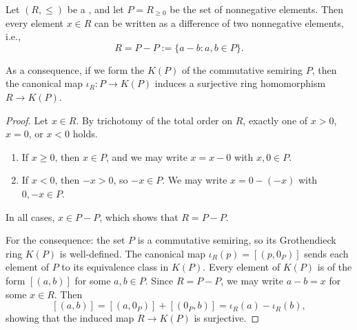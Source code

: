 \begin{proposition} \label{proposition:totally_ordered_ring_equals_P_minus_P_and_Grothendieck_recovery}
    Let $(R,\leq)$ be a , and let $P = R_{\geq 0}$ be the set of nonnegative elements. Then every element $x \in R$ can be written as a difference of two nonnegative elements, i.e.,
    $$R = P - P := \{a - b : a,b \in P\}.$$

    As a consequence, if we form the  $K(P)$ of the commutative semiring $P$, then the canonical map $\iota_R: P \to K(P)$ induces a surjective ring homomorphism $R \to K(P)$.
\end{proposition}

\begin{proof}
    Let $x \in R$. By trichotomy of the total order on $R$, exactly one of $x > 0$, $x = 0$, or $x < 0$ holds.

    \begin{enumerate}
        \item If $x \geq 0$, then $x \in P$, and we may write $x = x - 0$ with $x, 0 \in P$.
        \item If $x < 0$, then $-x > 0$, so $-x \in P$. We may write $x = 0 - (-x)$ with $0, -x \in P$.
    \end{enumerate}

    In all cases, $x \in P - P$, which shows that $R = P - P$.

    For the consequence: the set $P$ is a commutative semiring, so its Grothendieck ring $K(P)$ is well-defined. The canonical map $\iota_R(p) = [(p, 0_P)]$ sends each element of $P$ to its equivalence class in $K(P)$. Every element of $K(P)$ is of the form $[(a,b)]$ for some $a,b \in P$. Since $R = P - P$, we may write $a - b = x$ for some $x \in R$. Then
    $$[(a,b)] = [(a,0_P)] + [(0_P,b)] = \iota_R(a) - \iota_R(b),$$
    showing that the induced map $R \to K(P)$ is surjective.
\end{proof}

